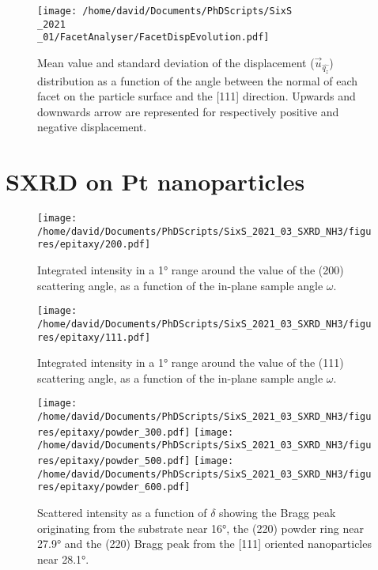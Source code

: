 \begin{figure}[!htb]
    \centering
    \texttt{[image: /home/david/Documents/PhDScripts/SixS\\\_2021\\\_01/FacetAnalyser/FacetDispEvolution.pdf]}
    \caption{
        Mean value and standard deviation of the displacement ($\vec{u}_{\hat{q_z}}$) distribution as a function of the angle between the normal of each facet on the particle surface and the [111] direction.
        Upwards and downwards arrow are represented for respectively positive and negative displacement.
    }
    \label{fig:AmaterasuDisplacement}
\end{figure}

\section{SXRD on Pt nanoparticles}

\begin{figure}[!htb]
    \centering
    \texttt{[image: /home/david/Documents/PhDScripts/SixS\_2021\_03\_SXRD\_NH3/figures/epitaxy/200.pdf]}
    \caption{
        Integrated intensity in a \ang{1} range around the value of the (200) scattering angle, as a function of the in-plane sample angle $\omega$.
    }
    \label{fig:Epitaxy200}
\end{figure}

\begin{figure}[!htb]
    \centering
    \texttt{[image: /home/david/Documents/PhDScripts/SixS\_2021\_03\_SXRD\_NH3/figures/epitaxy/111.pdf]}
    \caption{
        Integrated intensity in a \ang{1} range around the value of the (111) scattering angle, as a function of the in-plane sample angle $\omega$.
    }
    \label{fig:Epitaxy111}
\end{figure}

\begin{figure}[!htb]
    \centering
    \texttt{[image: /home/david/Documents/PhDScripts/SixS\_2021\_03\_SXRD\_NH3/figures/epitaxy/powder\_300.pdf]}
    \texttt{[image: /home/david/Documents/PhDScripts/SixS\_2021\_03\_SXRD\_NH3/figures/epitaxy/powder\_500.pdf]}
    \texttt{[image: /home/david/Documents/PhDScripts/SixS\_2021\_03\_SXRD\_NH3/figures/epitaxy/powder\_600.pdf]}
    \caption{
        Scattered intensity as a function of $\delta$ showing the Bragg peak originating from the substrate near \ang{16}, the
        (220) powder ring near \ang{27.9} and the (220) Bragg peak from the [111] oriented nanoparticles near \ang{28.1}.
    }
    \label{fig:PowderNanoparticles}
\end{figure}

